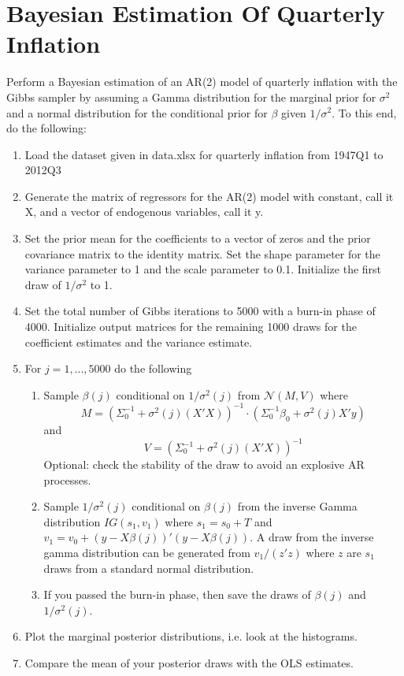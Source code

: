 \documentclass[a4paper]{scrartcl}
\begin{document}
\section{Bayesian Estimation Of Quarterly Inflation}
Perform a Bayesian estimation of an AR(2) model of quarterly inflation with the Gibbs sampler by assuming a Gamma distribution for the marginal prior for $\sigma^2$ and a normal distribution for the conditional prior for $\beta$ given $1/\sigma^2$. To this end, do the following:
\begin{enumerate}
	\item Load the dataset given in data.xlsx for quarterly inflation from 1947Q1 to 2012Q3
	\item Generate the matrix of regressors for the AR(2) model with constant, call it X, and a vector of endogenous variables, call it y.
	\item Set the prior mean for the coefficients to a vector of zeros and the prior covariance matrix to the identity matrix. Set the shape parameter for the variance parameter to 1 and the scale parameter to 0.1. Initialize the first draw of $1/\sigma^2$ to 1.
	\item Set the total number of Gibbs iterations to 5000 with a burn-in phase of 4000. Initialize output matrices for the remaining 1000 draws for the coefficient estimates and the variance estimate.
	\item For $j=1,...,5000$ do the following	
	\begin{enumerate}	
		\item Sample $\beta(j)$ conditional on $1/\sigma^2(j)$ from $\mathcal{N}(M,V)$ where 
		$$M=(\Sigma_0^{-1}+\sigma^2(j) (X'X))^{-1} \cdot (\Sigma_0^{-1}\beta_0+\sigma^2(j) X'y)$$ and 
		$$V=(\Sigma_0^{-1} +\sigma^2(j)(X'X))^{-1}$$
		Optional: check the stability of the draw to avoid an explosive AR processes.
		\item Sample $1/\sigma^2(j)$ conditional on $\beta(j)$ from the inverse Gamma distribution $IG(s_1,v_1)$ where $s_1 = s_0 + T$ and $v_1 = v_0 + (y-X\beta(j))'(y-X\beta(j))$. A draw from the inverse gamma distribution can be generated from $v_1/(z' z)$ where $z$ are $s_1$ draws from a standard normal distribution.
		\item If you passed the burn-in phase, then save the draws of $\beta(j)$ and $1/\sigma^2(j)$.
	\end{enumerate}
	\item Plot the marginal posterior distributions, i.e. look at the histograms.
	\item Compare the mean of your posterior draws with the OLS estimates.
\end{enumerate}
\end{document}
